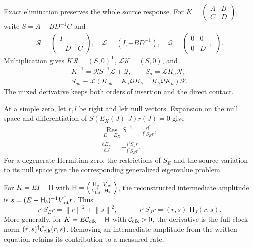 \documentclass[aps,prx,reprint,longbibliography]{revtex4-2}
\providecommand{\dd}{\mathrm d}
\providecommand{\C}{\mathbb C}
\providecommand{\norm}[1]{\left\lVert#1\right\rVert}
\begin{document}
Exact elimination preserves the whole source response. For $K=\left(\begin{smallmatrix}A&B\\C&D\end{smallmatrix}\right)$, write $S=A-BD^{-1}C$ and
\begin{equation}
 \begin{gathered}
 \mathcal R=\begin{pmatrix}I\\-D^{-1}C\end{pmatrix},\quad
 \mathcal L=(I,-BD^{-1}),\quad
 \mathcal Q=\begin{pmatrix}0&0\\0&D^{-1}\end{pmatrix}.
 \end{gathered}
 \label{ap:liftmaps}
\end{equation}
Multiplication gives $K\mathcal R=(S,0)^{\mathsf T}$, $\mathcal LK=(S,0)$, and
\begin{equation}
 \begin{gathered}
 K^{-1}=\mathcal RS^{-1}\mathcal L+\mathcal Q,\qquad S_a=\mathcal LK_a\mathcal R,\\
 S_{ab}=\mathcal L(K_{ab}-K_a\mathcal QK_b-K_b\mathcal QK_a)\mathcal R.
 \end{gathered}
 \label{ap:schurderivatives}
\end{equation}
The mixed derivative keeps both orders of insertion and the direct contact.

At a simple zero, let $r,l$ be right and left null vectors. Expansion on the null space and differentiation of $S(E_X(J),J)r(J)=0$ give
\begin{equation}
 \begin{gathered}
 \operatorname*{Res}_{E=E_X}S^{-1}
 =\frac{rl^\dagger}{l^\dagger S_Er},\\
 \frac{\dd E_X}{\dd J}
 =-\frac{l^\dagger S_Jr}{l^\dagger S_Er}.
 \end{gathered}
 \label{ap:poleresponse}
\end{equation}
For a degenerate Hermitian zero, the restrictions of $S_E$ and the source variation to its null space give the corresponding generalized eigenvalue problem.

For $K=EI-\mathsf H$ with $\mathsf H=\left(\begin{smallmatrix}\mathsf H_a&V_{\rm int}\\V_{\rm int}^\dagger&\mathsf H_b\end{smallmatrix}\right)$, the reconstructed intermediate amplitude is $s=(E-\mathsf H_b)^{-1}V_{\rm int}^\dagger r$. Thus
\begin{equation}
 r^\dagger S_Er=\norm r^2+\norm s^2,\qquad
 -r^\dagger S_Jr=(r,s)^\dagger \mathsf H_J(r,s).
 \label{ap:fullsource}
\end{equation}
More generally, for $K=E\mathcal C_{\rm clk}-\mathsf H$ with $\mathcal C_{\rm clk}>0$, the derivative is the full clock norm $(r,s)^\dagger\mathcal C_{\rm clk}(r,s)$. Removing an intermediate amplitude from the written equation retains its contribution to a measured rate.
\end{document}

